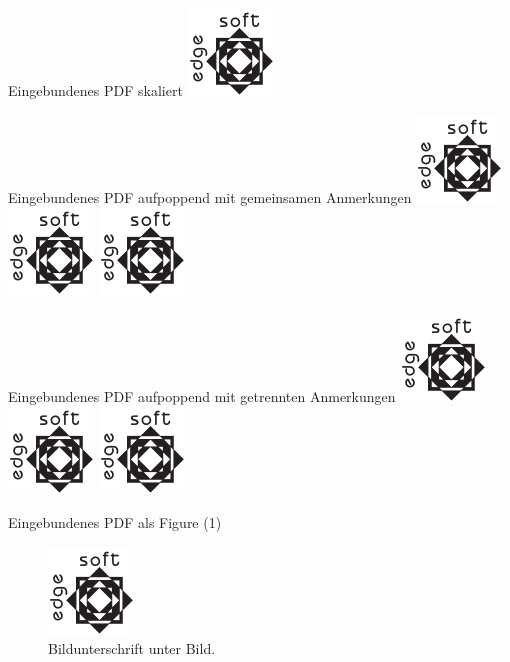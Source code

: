 \documentclass[t, aspectratio=169, handout, ngerman]{beamer}
\begin{document}
	\begin{frame}{Eingebundenes PDF skaliert}
		\includegraphics[width=\textwidth]{testlogo}
	\end{frame}

	\begin{frame}{Eingebundenes PDF aufpoppend mit gemeinsamen Anmerkungen}
		\includegraphics<1->{testlogo}
		\includegraphics<2->{testlogo}
		\includegraphics<3->{testlogo}
	\end{frame}

	\begin{frame}{Eingebundenes PDF aufpoppend mit getrennten Anmerkungen}
		\includegraphics<1->{testlogo}
		\includegraphics<2->{testlogo}
		\includegraphics<3->{testlogo}
	\end{frame}
	\AtBeginNote{}
	\AtEndNote{}

	\begin{frame}{Eingebundenes PDF als Figure (1)}
		\begin{figure}
			\includegraphics{testlogo}
			\caption{Bildunterschrift unter Bild.}
		\end{figure}
	\end{frame}
\end{document}
